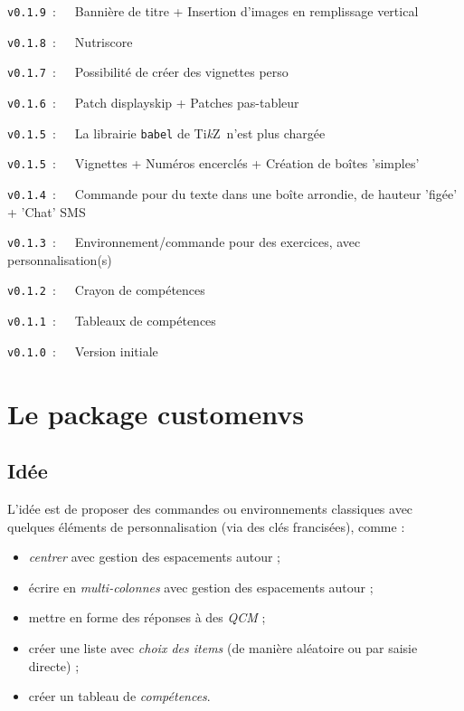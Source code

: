 \documentclass[french,11pt,a4paper]{article}
\providecommand\tikzlogo{Ti\textit{k}Z}
\let\TikZ\tikzlogo
\begin{document}
\verb|v0.1.9|~:~~~Bannière de titre + Insertion d'images en remplissage vertical

\verb|v0.1.8|~:~~~Nutriscore

\verb|v0.1.7|~:~~~Possibilité de créer des vignettes \textsf{perso}

\verb|v0.1.6|~:~~~Patch \textsf{displayskip} + Patches \textsf{pas-tableur}

\verb|v0.1.5|~:~~~La librairie \texttt{babel} de \TikZ\ n'est plus chargée

\verb|v0.1.5|~:~~~Vignettes + Numéros encerclés + Création de boîtes 'simples'

\verb|v0.1.4|~:~~~Commande pour du texte dans une boîte arrondie, de hauteur 'figée' + 'Chat' SMS

\verb|v0.1.3|~:~~~Environnement/commande pour des exercices, avec personnalisation(s)

\verb|v0.1.2|~:~~~Crayon de compétences

\verb|v0.1.1|~:~~~Tableaux de compétences

\verb|v0.1.0|~:~~~Version initiale

\pagebreak

\section{Le package customenvs}

\subsection{Idée}

L'idée est de proposer des commandes ou environnements classiques avec quelques éléments de personnalisation (via des \textsf{clés} francisées), comme :

\begin{itemize}
	\item \textit{centrer} avec gestion des espacements autour ;
	\item écrire en \textit{multi-colonnes} avec gestion des espacements autour ;
	\item mettre en forme des réponses à des \textit{QCM} ;
	\item créer une liste avec \textit{choix des items} (de manière aléatoire ou par saisie directe) ;
	\item créer un tableau de \textit{compétences}.
\end{itemize}
\end{document}

